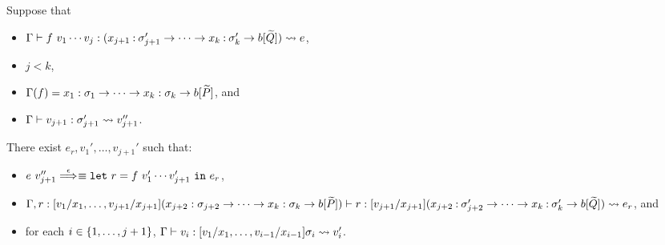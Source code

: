 \begin{lemma}
\label{lem:fun}
Suppose that
\begin{itemize}
\item \(\Gamma \vdash f\ v_1\cdots v_j : (x_{j+1}\mathbin{:}\sigma_{j+1}' \to \cdots \to x_k\mathbin{:}\sigma_k' \to b[\widetilde{Q}]) \leadsto e\),
\item \(j<k\),
\item \(\Gamma(f)=x_1:\sigma_1 \to \cdots \to x_k:\sigma_k \to b[\widetilde{P}]\), and
\item \(\Gamma \vdash v_{j+1} : \sigma_{j+1}' \leadsto v_{j+1}''\).
\end{itemize}
There exist \(e_r,v_1',\dots,v_{j+1}'\) such that:
\begin{itemize}
\item \(e\ v_{j+1}'' \stackrel{\epsilon}{\Longrightarrow}_{}\equiv \mathtt{let~}r=f\ v_1'\cdots v_{j+1}'\mathtt{~in~}{e_r}\),
\item
\(\Gamma,r:[v_1/x_1,\dots,v_{j+1}/x_{j+1}](x_{j+2}:\sigma_{j+2} \to \cdots \to x_k:\sigma_k \to b[\widetilde{P}]) \vdash r : [v_{j+1}/x_{j+1}](x_{j+2}\mathbin{:}\sigma_{j+2}' \to \cdots \to x_k\mathbin{:}\sigma_k' \to b[\widetilde{Q}]) \leadsto e_r\), and
\item for each \(i \in \{1,\dots,j+1\}\), \(\Gamma \vdash v_i : [v_1/x_1,\dots,v_{i-1}/x_{i-1}]\sigma_i \leadsto v_i'\).
\end{itemize}
\end{lemma}
